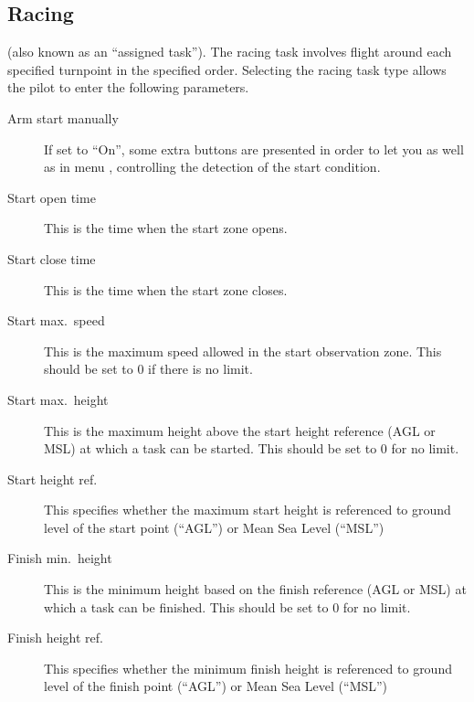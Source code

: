 \subsection*{Racing}
(also known as an ``assigned task'').  The racing task involves flight
around each specified turnpoint in the specified order.  Selecting the racing task 
type allows the pilot to enter the following parameters.
  \begin{description}
  \item [Arm start manually] If set to ``On'', some extra buttons are presented 
  in order to let you  as well as  in 
  menu , controlling  the detection of the start condition.
  \item [Start open time] This is the time when the start zone opens.
  \item [Start close time] This is the time when the start zone closes.
  \item [Start max.\ speed] This is the maximum speed allowed in the start observation
    zone.  This should be set to 0 if there is no limit.
  \item [Start max.\ height] This is the maximum height above the start height
    reference (AGL or MSL) at which a task can be started.  This  should be set to 
    0 for no limit.
  \item [Start height ref.] This specifies whether the maximum start height is 
    referenced to ground level of the start point (``AGL'') or Mean Sea Level (``MSL'')
  \item [Finish min.\ height] This is the minimum height based on the finish
    reference (AGL or MSL) at which a task can be finished.  This should be set to 
    0 for no limit.
  \item [Finish height ref.] This specifies whether the minimum finish height 
    is referenced to ground level of the finish point (``AGL'') or Mean Sea Level (``MSL'')
  \end{description}
  
